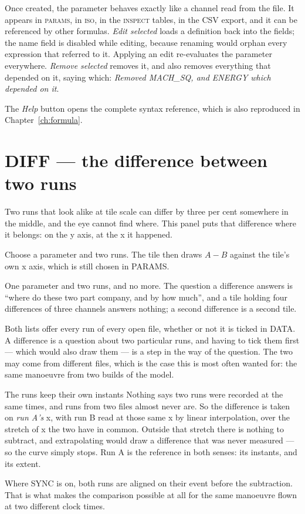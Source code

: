 \documentclass[11pt,a4paper,oneside]{report}
\newcommand{\tab}[1]{\textsc{#1}}
\begin{document}
Once created, the parameter behaves exactly like a channel read from the file.
It appears in \tab{params}, in \tab{iso}, in the \tab{inspect} tables, in the CSV
export, and it can be referenced by other formulas. \emph{Edit selected} loads a
definition back into the fields; the name field is disabled while editing,
because renaming would orphan every expression that referred to it. Applying an
edit re-evaluates the parameter everywhere. \emph{Remove selected} removes it,
and also removes everything that depended on it, saying which: \emph{Removed
MACH\_SQ, and ENERGY which depended on it}.

The \emph{Help} button opens the complete syntax reference, which is also
reproduced in Chapter~\ref{ch:formula}.

\section{DIFF --- the difference between two runs}
\label{sec:diff}

Two runs that look alike at tile scale can differ by three per cent somewhere in
the middle, and the eye cannot find where. This panel puts that difference where
it belongs: on the y axis, at the x it happened.

Choose a parameter and two runs. The tile then draws $A - B$ against the tile's
own x axis, which is still chosen in PARAMS.

One parameter and two runs, and no more. The question a difference answers is
``where do these two part company, and by how much'', and a tile holding four
differences of three channels answers nothing; a second difference is a second
tile.

Both lists offer every run of every open file, whether or not it is ticked in
DATA. A difference is a question about two particular runs, and having to tick
them first --- which would also draw them --- is a step in the way of the
question. The two may come from different files, which is the case this is most
often wanted for: the same manoeuvre from two builds of the model.

\begin{aoenote}{The runs keep their own instants}
Nothing says two runs were recorded at the same times, and runs from two files
almost never are. So the difference is taken on \emph{run A's} x, with run B
read at those same x by linear interpolation, over the stretch of x the two have
in common. Outside that stretch there is nothing to subtract, and extrapolating
would draw a difference that was never measured --- so the curve simply stops.
Run A is the reference in both senses: its instants, and its extent.

Where SYNC is on, both runs are aligned on their event before the subtraction.
That is what makes the comparison possible at all for the same manoeuvre flown
at two different clock times.
\end{aoenote}
\end{document}
